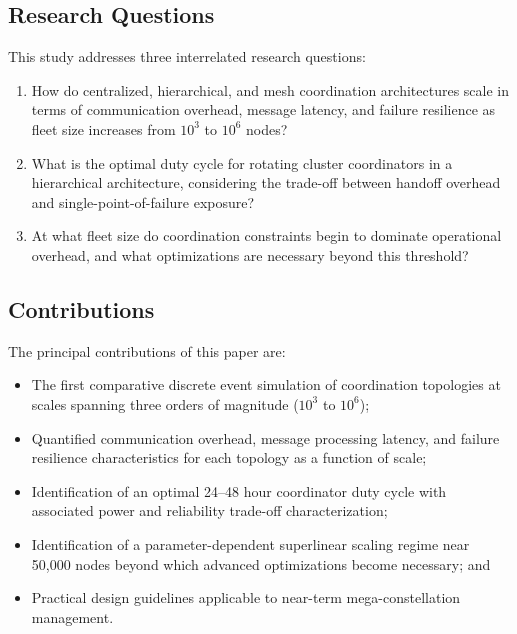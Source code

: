 \documentclass[journal]{IEEEtran}
\begin{document}
\subsection{Research Questions}

This study addresses three interrelated research questions:

\begin{enumerate}
    \item[\textbf{RQ1:}] How do centralized, hierarchical, and mesh coordination architectures scale in terms of communication overhead, message latency, and failure resilience as fleet size increases from $10^3$ to $10^6$ nodes?
    \item[\textbf{RQ2:}] What is the optimal duty cycle for rotating cluster coordinators in a hierarchical architecture, considering the trade-off between handoff overhead and single-point-of-failure exposure?
    \item[\textbf{RQ3:}] At what fleet size do coordination constraints begin to dominate operational overhead, and what optimizations are necessary beyond this threshold?
\end{enumerate}

\subsection{Contributions}

The principal contributions of this paper are:
\begin{itemize}
    \item The first comparative discrete event simulation of coordination topologies at scales spanning three orders of magnitude ($10^3$ to $10^6$);
    \item Quantified communication overhead, message processing latency, and failure resilience characteristics for each topology as a function of scale;
    \item Identification of an optimal 24--48 hour coordinator duty cycle with associated power and reliability trade-off characterization;
    \item Identification of a parameter-dependent superlinear scaling regime near 50{,}000 nodes beyond which advanced optimizations become necessary; and
    \item Practical design guidelines applicable to near-term mega-constellation management.
\end{itemize}


\end{document}
